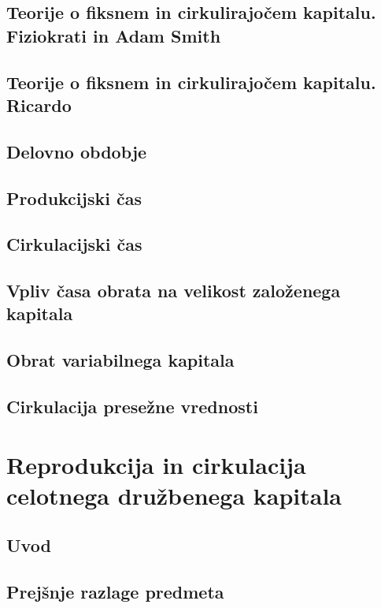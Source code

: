 \documentclass[egregdoesnotlikesansseriftitles]{scrbook}
\begin{document}
    \chapter{Teorije o fiksnem in cirkulirajočem kapitalu. Fiziokrati in Adam Smith}

    \chapter{Teorije o fiksnem in cirkulirajočem kapitalu. Ricardo}

    \chapter{Delovno obdobje}

    \chapter{Produkcijski čas}

    \chapter{Cirkulacijski čas}

    \chapter{Vpliv časa obrata na velikost založenega kapitala}

    \chapter{Obrat variabilnega kapitala}

    \chapter{Cirkulacija presežne vrednosti}

\part{Reprodukcija in cirkulacija celotnega družbenega kapitala}

\chapter{Uvod}

    \chapter{Prejšnje razlage predmeta}
\end{document}
